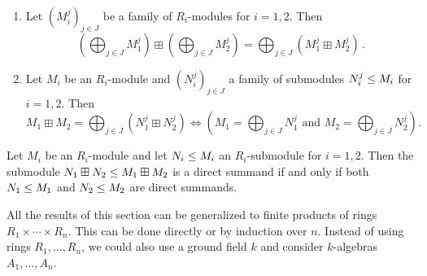 \begin{lemma}
  \leavevmode
  \begin{enumerate}
    \item
      Let $(M^j_i)_{j \in J}$ be a family of $R_i$-modules for $i = 1, 2$.
      Then
      \[
            \left( \bigoplus_{j \in J} M^j_1 \right) \boxplus \left( \bigoplus_{j \in J} M^j_2 \right)
          = \bigoplus_{j \in J} (M^j_1 \boxplus M^j_2) \,.
      \]
    \item
      Let $M_i$ be an $R_i$-module and $(N^j_i)_{j \in J}$ a family of submodules $N^j_i \leq M_i$ for $i = 1, 2$.
      Then
      \[
              M_1 \boxplus M_2 = \bigoplus_{j \in J} \left( N^j_1 \boxplus N^j_2 \right)
        \iff  \left(
                \text{$M_1  = \bigoplus_{j \in J} N^j_1$ and $M_2  = \bigoplus_{j \in J} N^j_2$}
              \right).
      \]
  \end{enumerate}
\end{lemma}




\begin{corollary}
  \label{corollary: direct summands for modules over products}
  Let $M_i$ be an $R_i$-module and let $N_i \leq M_i$ an $R_i$-submodule for $i = 1, 2$.
  Then the submodule $N_1 \boxplus N_2 \leq M_1 \boxplus M_2$ is a direct summand if and only if both $N_1 \leq M_1$ and $N_2 \leq M_2$ are direct summands.
\end{corollary}




\begin{remark}
  All the results of this section can be generalized to finite products of rings $R_1 \times \dotsb \times R_n$.
  This can be done directly or by induction over $n$.
  Instead of using rings $R_1, \dotsc, R_n$, we could also use a ground field $k$ and consider $k$-algebras $A_1, \dotsc, A_n$.
\end{remark}




